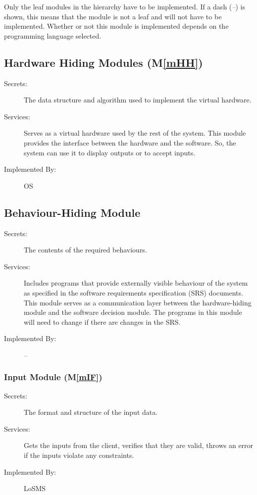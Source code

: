 \documentclass[12pt, titlepage]{article}
\newcommand{\mref}[1]{M\ref{#1}}
\newcommand{\famname}{LoSMS} %
\begin{document}
Only the leaf modules in the
hierarchy have to be implemented. If a dash (\emph{--}) is shown, this means
that the module is not a leaf and will not have to be implemented. Whether or
not this module is implemented depends on the programming language
selected.

\subsection{Hardware Hiding Modules (\mref{mHH})}

\begin{description}
\item[Secrets:]The data structure and algorithm used to implement the virtual
  hardware.
\item[Services:]Serves as a virtual hardware used by the rest of the
  system. This module provides the interface between the hardware and the
  software. So, the system can use it to display outputs or to accept inputs.
\item[Implemented By:] OS
\end{description}

\subsection{Behaviour-Hiding Module}

\begin{description}
\item[Secrets:]The contents of the required behaviours.
\item[Services:]Includes programs that provide externally visible behaviour of
  the system as specified in the software requirements specification (SRS)
  documents. This module serves as a communication layer between the
  hardware-hiding module and the software decision module. The programs in this
  module will need to change if there are changes in the SRS.
\item[Implemented By:] --
\end{description}

\subsubsection{Input Module (\mref{mIF})}

\begin{description}
\item[Secrets:]The format and structure of the input data.
\item[Services:]Gets the inputs from the client, verifies that they are valid, 
throws an error if the inputs violate any constraints.
\item[Implemented By:] \famname{}
\end{description}
	
\end{document}
